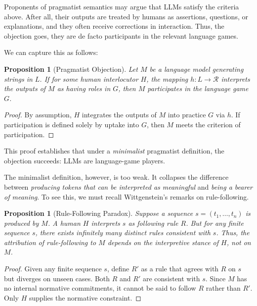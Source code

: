 \documentclass[12pt]{article}
\theoremstyle{plain}
\newtheorem{proposition}[theorem]{Proposition}
\theoremstyle{definition}
\theoremstyle{remark}
\begin{document}
Proponents of pragmatist semantics may argue that LLMs satisfy the criteria 
above. After all, their outputs are treated by humans as assertions, 
questions, or explanations, and they often receive corrections in interaction. 
Thus, the objection goes, they are de facto participants in the relevant 
language games. 

We can capture this as follows:

\begin{proposition}[Pragmatist Objection]
Let $M$ be a language model generating strings in $L$. 
If for some human interlocutor $H$, the mapping 
$h: L \to \mathcal{R}$ interprets the outputs of $M$ as having roles in $G$, 
then $M$ participates in the language game $G$. 
\end{proposition}

\begin{proof}
By assumption, $H$ integrates the outputs of $M$ into practice $G$ 
via $h$. If participation is defined solely by uptake into $G$, 
then $M$ meets the criterion of participation. \qedhere
\end{proof}

This proof establishes that under a \emph{minimalist} 
pragmatist definition, the objection succeeds: LLMs are language-game players. 

The minimalist definition, however, is too weak. 
It collapses the difference between \emph{producing tokens that can be 
interpreted as meaningful} and \emph{being a bearer of meaning}. 
To see this, we must recall Wittgenstein’s remarks on rule-following. 

\begin{proposition}[Rule-Following Paradox]
Suppose a sequence $s = (t_1, \ldots, t_n)$ is produced by $M$. 
A human $H$ interprets $s$ as following rule $R$. 
But for any finite sequence $s$, there exists infinitely many distinct rules 
consistent with $s$. Thus, the attribution of rule-following to $M$ 
depends on the interpretive stance of $H$, not on $M$. 
\end{proposition}

\begin{proof}
Given any finite sequence $s$, define $R'$ as a rule that agrees with $R$ 
on $s$ but diverges on unseen cases. Both $R$ and $R'$ are consistent 
with $s$. Since $M$ has no internal normative commitments, 
it cannot be said to follow $R$ rather than $R'$. 
Only $H$ supplies the normative constraint. \qedhere
\end{proof}
\end{document}
